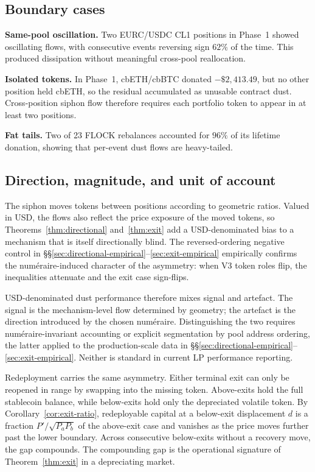 \documentclass{manuscript}
\begin{document}
\subsection{Boundary cases}\label{sec:boundary}

\textbf{Same-pool oscillation.} Two EURC/USDC CL1 positions in Phase~1 showed oscillating flows, with consecutive events reversing sign $62\%$ of the time. This produced dissipation without meaningful cross-pool reallocation.

\textbf{Isolated tokens.} In Phase~1, cbETH/cbBTC donated $-\$2{,}413.49$, but no other position held cbETH, so the residual accumulated as unusable contract dust. Cross-position siphon flow therefore requires each portfolio token to appear in at least two positions.

\textbf{Fat tails.} Two of 23 FLOCK rebalances accounted for $96\%$ of its lifetime donation, showing that per-event dust flows are heavy-tailed.

\subsection{Direction, magnitude, and unit of account}\label{sec:direction-discussion}

The siphon moves tokens between positions according to geometric ratios. Valued in USD, the flows also reflect the price exposure of the moved tokens, so Theorems~\ref{thm:directional} and~\ref{thm:exit} add a USD-denominated bias to a mechanism that is itself directionally blind. The reversed-ordering negative control in \S\S\ref{sec:directional-empirical}--\ref{sec:exit-empirical} empirically confirms the numéraire-induced character of the asymmetry: when V3 token roles flip, the inequalities attenuate and the exit case sign-flips.

USD-denominated dust performance therefore mixes signal and artefact. The signal is the mechanism-level flow determined by geometry; the artefact is the direction introduced by the chosen num\'eraire. Distinguishing the two requires num\'eraire-invariant accounting or explicit segmentation by pool address ordering, the latter applied to the production-scale data in \S\S\ref{sec:directional-empirical}--\ref{sec:exit-empirical}. Neither is standard in current LP performance reporting.

Redeployment carries the same asymmetry. Either terminal exit can only be reopened in range by swapping into the missing token. Above-exits hold the full stablecoin balance, while below-exits hold only the depreciated volatile token. By Corollary~\ref{cor:exit-ratio}, redeployable capital at a below-exit displacement $d$ is a fraction $P'/\sqrt{P_a P_b}$ of the above-exit case and vanishes as the price moves further past the lower boundary. Across consecutive below-exits without a recovery move, the gap compounds. The compounding gap is the operational signature of Theorem~\ref{thm:exit} in a depreciating market.
\end{document}
